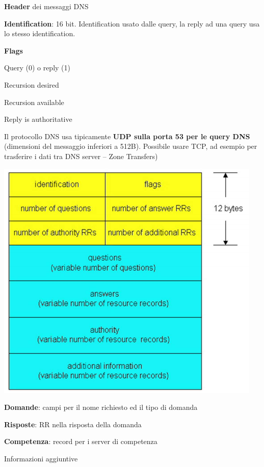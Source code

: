 \documentclass[10pt]{article}
\begin{document}
\begin{multicols}{2}
\textbf{Header} dei messaggi DNS
\begin{list}{}{}
\item \textbf{Identification}: 16 bit. Identification usato dalle query, la reply ad una query usa lo stesso identification.
\item \textbf{Flags}
\begin{list}{}{}
\item Query (0) o reply (1)
\item Recursion desired
\item Recursion available
\item Reply is authoritative
\end{list}
\end{list}
Il protocollo DNS usa tipicamente \textbf{UDP sulla porta 53 per le query DNS} (dimensioni del messaggio inferiori a 512B). Possibile usare TCP, ad esempio per trasferire i dati tra DNS server -- Zone Transfers)


\includegraphics[scale=0.7]{dnsmsgheader.png}
\end{multicols}
\begin{list}{}{}
\item \textbf{Domande}: campi per il nome richiesto ed il tipo di domanda
\item \textbf{Risposte}: RR nella risposta della domanda
\item \textbf{Competenza}: record per i server di competenza
\item Informazioni aggiuntive
\end{list}
\end{document}
